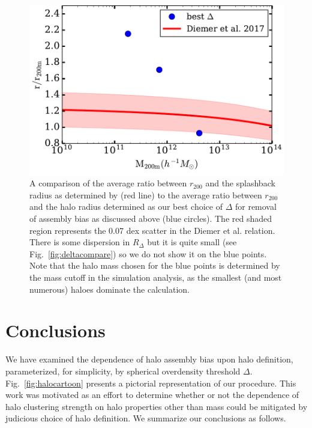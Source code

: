 \documentclass[usenatbib,fleqn]{mnras}
\begin{document}
\begin{figure}
	\centering
	\includegraphics[width=\columnwidth]{test_splashback.pdf}
	\caption{A comparison of the average ratio between $r_{200}$ and the splashback radius as determined by \citet{diemer_etal17} (red line) to the average ratio between $r_{200}$ and the halo radius determined as our best choice of $\Delta$ for removal of assembly bias as discussed above (blue circles). The red shaded region represents the 0.07 dex scatter in the Diemer et al. relation. There is some dispersion in $R_{\Delta}$ but it is quite small (see Fig.~\ref{fig:deltacompare}) so we do not show it on the blue points. Note that the halo mass chosen for the blue points is determined by the mass cutoff in the simulation analysis, as the smallest (and most numerous) haloes dominate the calculation.
}
	\label{fig:splashback_compare}
\end{figure}

\section[]{Conclusions}
\label{section:conclusions}

We have examined the dependence of halo assembly bias upon halo definition, parameterized, for simplicity, by spherical overdensity threshold $\Delta$. Fig.~\ref{fig:halocartoon} presents a pictorial representation of our procedure. This work was motivated as an effort to determine whether or not the dependence of halo clustering strength on halo properties other than mass could be mitigated by judicious choice of halo definition. We summarize our conclusions as follows.
\end{document}

